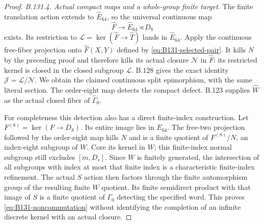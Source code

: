 \begin{proof}
\emph{B.131.4. Actual compact maps and a whole-group finite target.}
The finite translation action extends to $\widehat E_{64}$, so the
universal continuous map
\[
 \widehat F\longrightarrow\widehat E_{64}\rtimes D_8
\]
exists. Its restriction to
$\mathcal L=\ker(\widehat F\to\widehat T)$ lands in
$\widehat E_{64}$. Apply the continuous free-fiber projection onto
$\widehat F(X,Y)$ defined by \eqref{eq:B131-selected-pair}.
It kills $N$ by the preceding proof and therefore kills its actual
closure $\mathcal N$ in $\widehat F$: its restricted kernel is closed
in the closed subgroup $\mathcal L$. B.128 gives the exact identity
$\mathcal J=\mathcal L/\mathcal N$. We obtain the claimed continuous
split epimorphism, with the same literal section. The order-eight
map detects the compact defect. B.123 supplies $\widehat W$ as the
actual closed fiber of $\widehat\Gamma_0$.

For completeness this detection also has a direct finite-index
construction. Let $F^{(8)}=\ker(F\to D_8)$. Its entire image lies in
$E_{64}$. The free-two projection followed by the order-eight map
kills $N$ and is a finite quotient of $F^{(8)}/N$, an index-eight
subgroup of $W$. Core its kernel in $W$; this finite-index normal
subgroup still excludes $[m,D_s]$. Since $W$ is finitely generated,
the intersection of all subgroups with index at most that finite index
is a characteristic finite-index refinement. The actual $S$ action
then factors through the finite automorphism group of the resulting
finite $W$ quotient. Its finite semidirect product with that image of
$S$ is a finite quotient of $\Gamma_0$ detecting the specified word.
This proves \eqref{eq:B131-noncommutation} without identifying the
completion of an infinite discrete kernel with an actual closure.


\end{proof}
